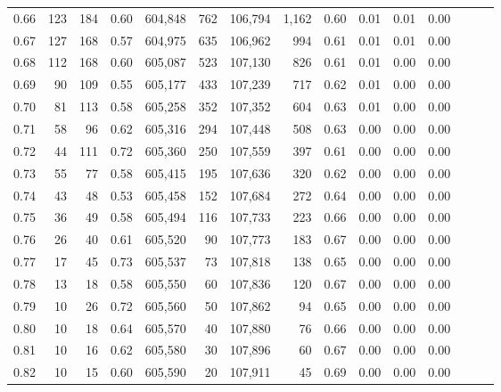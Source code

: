 \begin{tabular}{rrrrrrrrrrrrrrr}
0.66 &     123 &    184 &  0.60 &  604,848 &      762 &  106,794 &    1,162 &  0.60 &  0.01 &  0.01 &      0.00 \\
0.67 &     127 &    168 &  0.57 &  604,975 &      635 &  106,962 &      994 &  0.61 &  0.01 &  0.01 &      0.00 \\
0.68 &     112 &    168 &  0.60 &  605,087 &      523 &  107,130 &      826 &  0.61 &  0.01 &  0.00 &      0.00 \\
0.69 &      90 &    109 &  0.55 &  605,177 &      433 &  107,239 &      717 &  0.62 &  0.01 &  0.00 &      0.00 \\
0.70 &      81 &    113 &  0.58 &  605,258 &      352 &  107,352 &      604 &  0.63 &  0.01 &  0.00 &      0.00 \\
0.71 &      58 &     96 &  0.62 &  605,316 &      294 &  107,448 &      508 &  0.63 &  0.00 &  0.00 &      0.00 \\
0.72 &      44 &    111 &  0.72 &  605,360 &      250 &  107,559 &      397 &  0.61 &  0.00 &  0.00 &      0.00 \\
0.73 &      55 &     77 &  0.58 &  605,415 &      195 &  107,636 &      320 &  0.62 &  0.00 &  0.00 &      0.00 \\
0.74 &      43 &     48 &  0.53 &  605,458 &      152 &  107,684 &      272 &  0.64 &  0.00 &  0.00 &      0.00 \\
0.75 &      36 &     49 &  0.58 &  605,494 &      116 &  107,733 &      223 &  0.66 &  0.00 &  0.00 &      0.00 \\
0.76 &      26 &     40 &  0.61 &  605,520 &       90 &  107,773 &      183 &  0.67 &  0.00 &  0.00 &      0.00 \\
0.77 &      17 &     45 &  0.73 &  605,537 &       73 &  107,818 &      138 &  0.65 &  0.00 &  0.00 &      0.00 \\
0.78 &      13 &     18 &  0.58 &  605,550 &       60 &  107,836 &      120 &  0.67 &  0.00 &  0.00 &      0.00 \\
0.79 &      10 &     26 &  0.72 &  605,560 &       50 &  107,862 &       94 &  0.65 &  0.00 &  0.00 &      0.00 \\
0.80 &      10 &     18 &  0.64 &  605,570 &       40 &  107,880 &       76 &  0.66 &  0.00 &  0.00 &      0.00 \\
0.81 &      10 &     16 &  0.62 &  605,580 &       30 &  107,896 &       60 &  0.67 &  0.00 &  0.00 &      0.00 \\
0.82 &      10 &     15 &  0.60 &  605,590 &       20 &  107,911 &       45 &  0.69 &  0.00 &  0.00 &      0.00 \\

\end{tabular}
